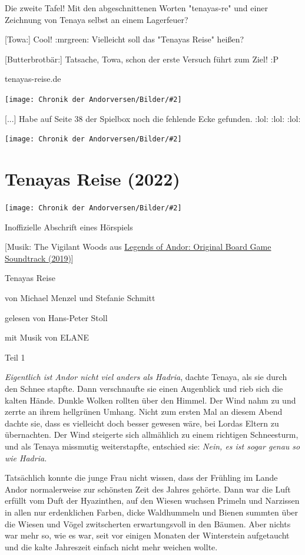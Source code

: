 \documentclass[10pt, a4paper, oneside]{book}
\newcommand{\fillbreak}{\vspace*{\fill}\columnbreak}
\newcommand{\storytext}[1]{%
    \section{#1}%
    \label{Storytext: #1}%
}
\newcommand{\refprodukt}[1]{\hyperref[Produkt: #1]{#1}}
\newcommand{\bildmitts}[2][height=0.32\textwidth,width=0.48\textwidth,keepaspectratio]{%
    \begin{center}
        \texttt{[image: Chronik der Andorversen/Bilder/\#2]}
    \end{center}
}
\begin{document}
\begin{multicols}{2}
Die zweite Tafel! Mit den abgeschnittenen Worten "tenayas-re" und einer Zeichnung von Tenaya selbst an einem Lagerfeuer?

[Towa:]  Cool! :mrgreen:
Vielleicht soll das "Tenayas Reise" heißen?

[Butterbrotbär:] Tatsache, Towa, schon der erste Versuch führt zum Ziel! :P

tenayas-reise.de

\bildmitts{AA2022 Rätsel um Tafel 3.jpeg}

[...] Habe auf Seite 38 der Spielbox noch die fehlende Ecke gefunden. :lol: :lol: :lol:

\bildmitts{AA2022 Rätsel um Tafel 4.png}




\fillbreak
\storytext{Tenayas Reise (2022)}

\bildmitts{Tenayas Reise (2022).jpg}

\begin{center}
    Inoffizielle Abschrift eines Hörspiels
\end{center}

[Musik: The Vigilant Woods aus \refprodukt{Legends of Andor: Original Board Game Soundtrack (2019)}]\bigskip


Tenayas Reise

von Michael Menzel und Stefanie Schmitt

gelesen von Hans-Peter Stoll

mit Musik von ELANE

Teil 1\bigskip

\textit{Eigentlich ist Andor nicht viel anders als Hadria}, dachte Tenaya, als sie durch den Schnee stapfte. Dann verschnaufte sie einen Augenblick und rieb sich die kalten Hände. Dunkle Wolken rollten über den Himmel. Der Wind nahm zu und zerrte an ihrem hellgrünen Umhang. Nicht zum ersten Mal an diesem Abend dachte sie, dass es vielleicht doch besser gewesen wäre, bei Lordas Eltern zu übernachten. Der Wind steigerte sich allmählich zu einem richtigen Schneesturm, und als Tenaya missmutig weiterstapfte, entschied sie: \textit{Nein, es ist sogar genau so wie Hadria.}

Tatsächlich konnte die junge Frau nicht wissen, dass der Frühling im Lande Andor normalerweise zur schönsten Zeit des Jahres gehörte. Dann war die Luft erfüllt vom Duft der Hyazinthen, auf den Wiesen wuchsen Primeln und Narzissen in allen nur erdenklichen Farben, dicke Waldhummeln und Bienen summten über die Wiesen und Vögel zwitscherten erwartungsvoll in den Bäumen. Aber nichts war mehr so, wie es war, seit vor einigen Monaten der Winterstein aufgetaucht und die kalte Jahreszeit einfach nicht mehr weichen wollte.


\end{multicols}
\end{document}
